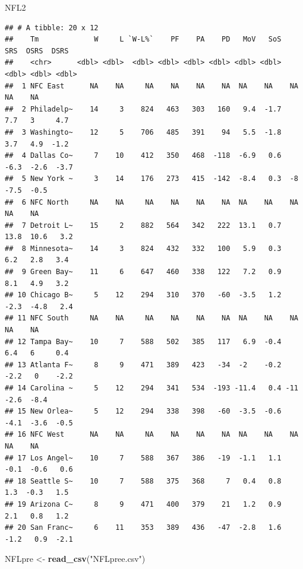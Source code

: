 \documentclass[
]{article}
\newenvironment{Shaded}{\begin{snugshade}}{\end{snugshade}}
\newcommand{\FunctionTok}[1]{\textcolor[rgb]{0.13,0.29,0.53}{\textbf{#1}}}
\newcommand{\NormalTok}[1]{#1}
\newcommand{\OtherTok}[1]{\textcolor[rgb]{0.56,0.35,0.01}{#1}}
\newcommand{\StringTok}[1]{\textcolor[rgb]{0.31,0.60,0.02}{#1}}
\begin{document}
\begin{Shaded}
\begin{Highlighting}[]
\NormalTok{NFL2}
\end{Highlighting}
\end{Shaded}

\begin{verbatim}
## # A tibble: 20 x 12
##    Tm             W     L `W-L%`    PF    PA    PD   MoV   SoS   SRS  OSRS  DSRS
##    <chr>      <dbl> <dbl>  <dbl> <dbl> <dbl> <dbl> <dbl> <dbl> <dbl> <dbl> <dbl>
##  1 NFC East      NA    NA     NA    NA    NA    NA  NA    NA    NA    NA    NA  
##  2 Philadelp~    14     3    824   463   303   160   9.4  -1.7   7.7   3     4.7
##  3 Washingto~    12     5    706   485   391    94   5.5  -1.8   3.7   4.9  -1.2
##  4 Dallas Co~     7    10    412   350   468  -118  -6.9   0.6  -6.3  -2.6  -3.7
##  5 New York ~     3    14    176   273   415  -142  -8.4   0.3  -8    -7.5  -0.5
##  6 NFC North     NA    NA     NA    NA    NA    NA  NA    NA    NA    NA    NA  
##  7 Detroit L~    15     2    882   564   342   222  13.1   0.7  13.8  10.6   3.2
##  8 Minnesota~    14     3    824   432   332   100   5.9   0.3   6.2   2.8   3.4
##  9 Green Bay~    11     6    647   460   338   122   7.2   0.9   8.1   4.9   3.2
## 10 Chicago B~     5    12    294   310   370   -60  -3.5   1.2  -2.3  -4.8   2.4
## 11 NFC South     NA    NA     NA    NA    NA    NA  NA    NA    NA    NA    NA  
## 12 Tampa Bay~    10     7    588   502   385   117   6.9  -0.4   6.4   6     0.4
## 13 Atlanta F~     8     9    471   389   423   -34  -2    -0.2  -2.2   0    -2.2
## 14 Carolina ~     5    12    294   341   534  -193 -11.4   0.4 -11    -2.6  -8.4
## 15 New Orlea~     5    12    294   338   398   -60  -3.5  -0.6  -4.1  -3.6  -0.5
## 16 NFC West      NA    NA     NA    NA    NA    NA  NA    NA    NA    NA    NA  
## 17 Los Angel~    10     7    588   367   386   -19  -1.1   1.1  -0.1  -0.6   0.6
## 18 Seattle S~    10     7    588   375   368     7   0.4   0.8   1.3  -0.3   1.5
## 19 Arizona C~     8     9    471   400   379    21   1.2   0.9   2.1   0.8   1.2
## 20 San Franc~     6    11    353   389   436   -47  -2.8   1.6  -1.2   0.9  -2.1
\end{verbatim}

\begin{Shaded}
\begin{Highlighting}[]
\NormalTok{NFLpre }\OtherTok{\textless{}{-}} \FunctionTok{read\_csv}\NormalTok{(}\StringTok{"NFLpree.csv"}\NormalTok{)}
\end{Highlighting}
\end{Shaded}
\end{document}
